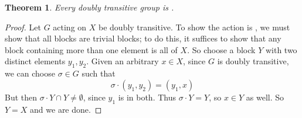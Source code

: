 \documentclass[12pt]{article}
\newtheorem*{thm}{Theorem}
\begin{document}
\begin{thm} Every doubly transitive group is .
\end{thm}
\begin{proof}
Let $G$ acting on $X$ be doubly transitive. To show the action is , we must show that all blocks are trivial blocks; to do this, it suffices to show that any block containing more than one element is all of $X$. So choose a block $Y$ with two distinct elements $y_1, y_2$. Given an arbitrary $x\in X$, since $G$ is doubly transitive, we can choose $\sigma\in G$ such that
\[\sigma\cdot(y_1,y_2)=(y_1,x)\]
But then $\sigma\cdot Y\cap Y\neq\emptyset$, since $y_1$ is in both. Thus $\sigma\cdot Y=Y$, so $x\in Y$ as well. So $Y=X$ and we are done.
\end{proof}
\end{document}
